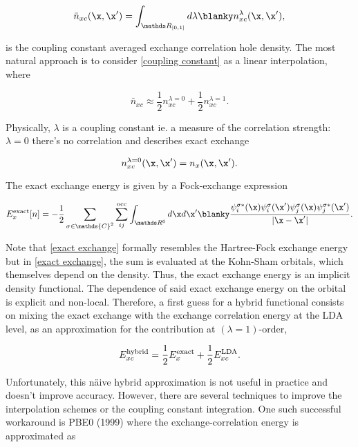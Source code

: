 \documentclass{homework}
\begin{document}
\begin{equation}
    \bar{n}_{xc}(\x, \x') = \int_{\R_{[0,1]}} d\lambda \blanky n_{xc}^\lambda(\x, \x'), 
    \label{coupling constant}
\end{equation}

is the coupling constant averaged exchange correlation hole density. The most natural approach is to consider \eqref{coupling constant} as a linear interpolation, where

\begin{equation}
    \bar{n}_{xc} \approx \frac{1}{2} n_{xc}^{\lambda = 0} + \frac{1}{2} n_{xc}^{\lambda = 1}.
\end{equation}

Physically, $\lambda$ is a coupling constant ie. a measure of the correlation strength: $\lambda = 0$ there's no correlation and describes exact exchange

$$
n_{xc}^{\lambda = 0}(\x, \x') = n_{x}(\x, \x').
$$

The exact exchange energy is given by a Fock-exchange expression

\begin{equation}
    E_x^{\textnormal{exact}}[n] = -\frac{1}{2} \sum_{\sigma \in \mathds{C}^2} \sum_{ij}^{\textnormal{occ}} \int_{\R^6} d\x d\x' \blanky \frac{\psi_{i}^{\sigma {*}} (\x) \psi_{i}^{\sigma} (\x') \psi_{j}^{\sigma} (\x) \psi_{j}^{\sigma {*}} (\x')}{|\x - \x'|}.
    \label{exact exchange}
\end{equation}

Note that \eqref{exact exchange} formally resembles the Hartree-Fock exchange energy but in \eqref{exact exchange}, the sum is evaluated at the Kohn-Sham orbitals, which themselves depend on the density. Thus, the exact exchange energy is an implicit density functional. The dependence of said exact exchange energy on the orbital is explicit and non-local. Therefore, a first guess for a hybrid functional consists on mixing the exact exchange with the exchange correlation energy at the LDA level, as an approximation for the contribution at $(\lambda=1)$-order,

\begin{equation}
    E_{xc}^{\textnormal{hybrid}} = \frac{1}{2}    E_{x}^{\textnormal{exact}} + \frac{1}{2}    E_{xc}^{\textnormal{LDA}}.
    \label{naive hybrid}
\end{equation}

Unfortunately, this n\"aive hybrid approximation is not useful in practice and doesn't improve accuracy. However, there are several techniques to improve the interpolation schemes or the coupling constant integration. One such successful workaround is PBE0 (1999) where the exchange-correlation energy is approximated as 
\end{document}
